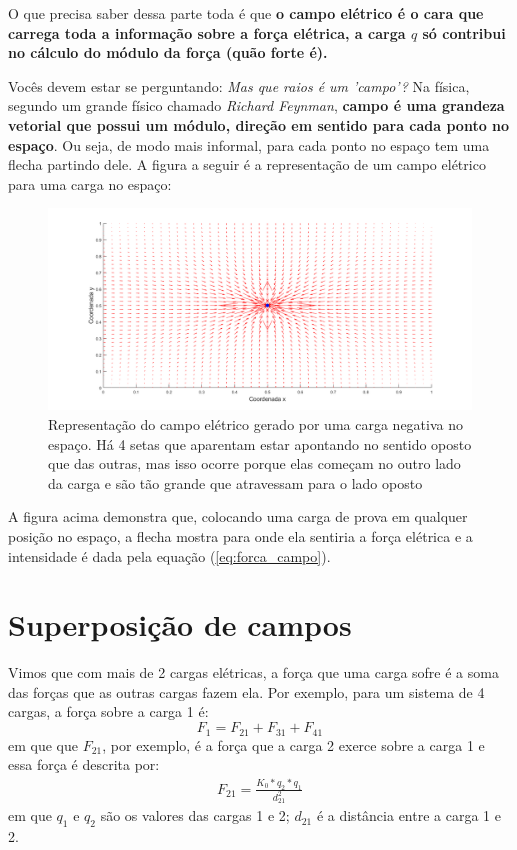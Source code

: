 \documentclass[12pt]{extarticle}
\newcommand{\<}{\langle}
\renewcommand{\>}{\rangle}
\theoremstyle{definition}
\begin{document}
 O que precisa saber dessa parte toda é que \textbf{o campo elétrico é o cara que carrega toda a informação sobre a força elétrica, a carga $q$ só contribui no cálculo do módulo da força (quão forte é).}
 
 Vocês devem estar se perguntando: \textit{Mas que raios é um 'campo'?} Na física, segundo um grande físico chamado \textit{Richard Feynman}, \textbf{campo é uma grandeza vetorial que possui um módulo, direção em sentido para cada ponto no espaço}. Ou seja, de modo mais informal, para cada ponto no espaço tem uma flecha partindo dele. A figura a seguir é a representação de um campo elétrico para uma carga no espaço:
 \begin{figure} [H]
     \centering
     \includegraphics[width=\linewidth]{campo_eletrico.png}
     \caption{Representação do campo elétrico gerado por uma carga negativa no espaço. Há 4 setas que aparentam estar apontando no sentido oposto que das outras, mas isso ocorre porque elas começam no outro lado da carga e são tão grande que atravessam para o lado oposto}
     \label{fig:campo_eletrico}
 \end{figure}
 
 A figura acima demonstra que, colocando uma carga de prova em qualquer posição no espaço, a flecha mostra para onde ela sentiria a força elétrica e a intensidade é dada pela equação (\ref{eq:forca_campo}). 
 
\section{Superposição de campos}

Vimos que com mais de 2 cargas elétricas, a força que uma carga sofre é a soma das forças que as outras cargas fazem ela. Por exemplo, para um sistema de 4 cargas, a força sobre a carga 1 é:
\begin{equation}
    F_{1} = F_{21} + F_{31} + F_{41} 
\end{equation}
em que que $F_{21}$, por exemplo, é a força que a carga 2 exerce sobre a carga 1 e essa força é descrita por:
\begin{align*}
    F_{21} = \frac{K_{0}*q_{2}*q_{1}}{d_{21}^{2}}
\end{align*}
em que $q_{1}$ e $q_{2}$ são os valores das cargas 1 e 2; $d_{21}$ é a distância entre a carga 1 e 2.
\end{document}
